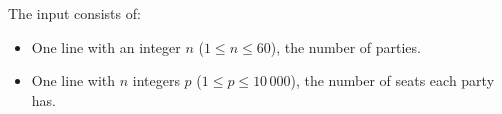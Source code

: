 
    The input consists of:
    \begin{itemize}
        \item One line with an integer $n$ ($1 \le n \le 60$), the number of parties.
        \item One line with $n$ integers $p$ ($1 \le p \le 10\,000$), the number of seats each party has.
    \end{itemize}
